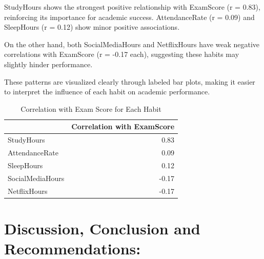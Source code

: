 \documentclass[
  11pt,
  a4paper,
]{article}
\begin{document}
StudyHours shows the strongest positive relationship with ExamScore (r =
0.83), reinforcing its importance for academic success. AttendanceRate
(r = 0.09) and SleepHours (r = 0.12) show minor positive associations.

On the other hand, both SocialMediaHours and NetflixHours have weak
negative correlations with ExamScore (r = -0.17 each), suggesting these
habits may slightly hinder performance.

These patterns are visualized clearly through labeled bar plots, making
it easier to interpret the influence of each habit on academic
performance.

\begin{longtable}[]{@{}lr@{}}

\caption{\label{tbl-good-habits-correlation}Correlation with Exam Score
for Each Habit}

\tabularnewline

\toprule\noalign{}
& Correlation with ExamScore \\
\midrule\noalign{}
\endhead
\bottomrule\noalign{}
\endlastfoot
StudyHours & 0.83 \\
AttendanceRate & 0.09 \\
SleepHours & 0.12 \\
SocialMediaHours & -0.17 \\
NetflixHours & -0.17 \\

\end{longtable}

\newpage

\section{Discussion, Conclusion and
Recommendations:}\label{discussion-conclusion-and-recommendations}
\end{document}
